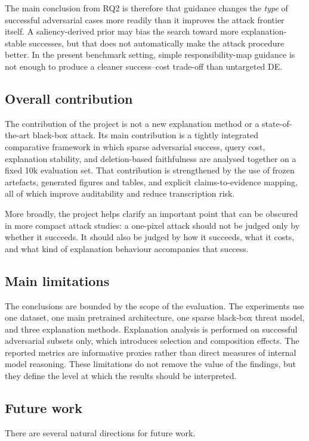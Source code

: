 The main conclusion from RQ2 is therefore that guidance changes the \emph{type} of successful adversarial cases more readily than it improves the attack frontier itself.
A saliency-derived prior may bias the search toward more explanation-stable successes, but that does not automatically make the attack procedure better.
In the present benchmark setting, simple responsibility-map guidance is not enough to produce a cleaner success--cost trade-off than untargeted DE.

\subsection{Overall contribution}
The contribution of the project is not a new explanation method or a state-of-the-art black-box attack.
Its main contribution is a tightly integrated comparative framework in which sparse adversarial success, query cost, explanation stability, and deletion-based faithfulness are analysed together on a fixed 10k evaluation set.
That contribution is strengthened by the use of frozen artefacts, generated figures and tables, and explicit claims-to-evidence mapping, all of which improve auditability and reduce transcription risk.

More broadly, the project helps clarify an important point that can be obscured in more compact attack studies:
a one-pixel attack should not be judged only by whether it succeeds.
It should also be judged by how it succeeds, what it costs, and what kind of explanation behaviour accompanies that success.

\subsection{Main limitations}
The conclusions are bounded by the scope of the evaluation.
The experiments use one dataset, one main pretrained architecture, one sparse black-box threat model, and three explanation methods.
Explanation analysis is performed on successful adversarial subsets only, which introduces selection and composition effects.
The reported metrics are informative proxies rather than direct measures of internal model reasoning.
These limitations do not remove the value of the findings, but they define the level at which the results should be interpreted.

\subsection{Future work}
There are several natural directions for future work.

